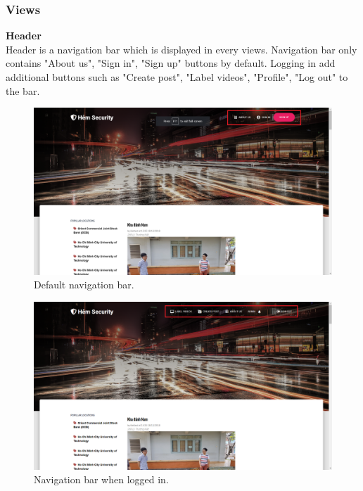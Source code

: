 \subsubsection{Views}
\textbf{Header}
\\
Header is a navigation bar which is displayed in every views. Navigation bar only contains "About us", "Sign in", "Sign up" buttons by default. Logging in add additional buttons such as "Create post", "Label videos",  "Profile", "Log out" to the bar.
\begin{center}
    \begin{figure}[H]
    \centering
    \includegraphics[width=1\columnwidth]{images/chap4/header_not_login.png}
    \caption{Default navigation bar.}
    \end{figure}
\end{center}

\begin{center}
    \begin{figure}[H]
    \centering
    \includegraphics[width=1\columnwidth]{images/chap4/header.png}
    \caption{Navigation bar when logged in.}
    \end{figure}
\end{center}

